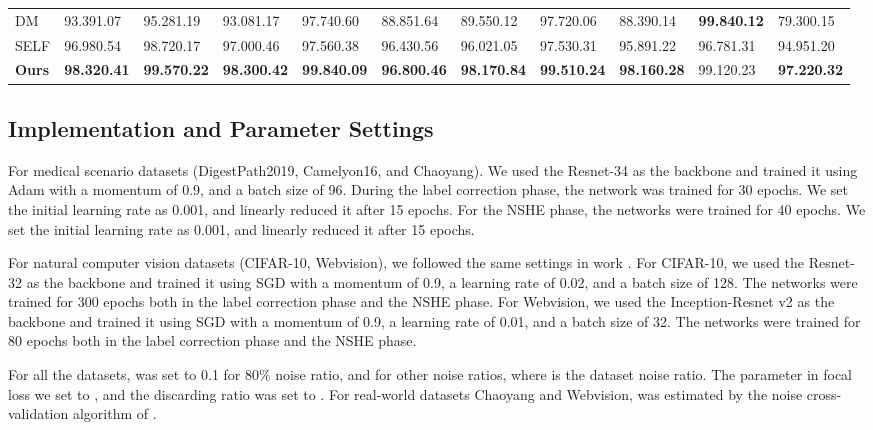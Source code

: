 \begin{table*}[]
\begin{tabular}{@{}lllllllllll@{}}
DM                       & 93.391.07          & 95.281.19          & 93.081.17               & 97.740.60          & 88.851.64             & 89.550.12          & 97.720.06          & 88.390.14               & \textbf{99.840.12} & 79.300.15             \\
SELF                            & 96.980.54          & 98.720.17          & 97.000.46               & 97.560.38          & 96.430.56             & 96.021.05          & 97.530.31          & 95.891.22               & 96.781.31          & 94.951.20             \\
\textbf{Ours}                   & \textbf{98.320.41} & \textbf{99.570.22} & \textbf{98.300.42}      & \textbf{99.840.09} & \textbf{96.800.46}    & \textbf{98.170.84} & \textbf{99.510.24} & \textbf{98.160.28}      & 99.120.23          & \textbf{97.220.32}    \\ \bottomrule
\end{tabular}
\end{table*}

\subsection{Implementation and Parameter Settings}
\label{sec:impl}

For medical scenario datasets (DigestPath2019, Camelyon16, and Chaoyang). We used the Resnet-34 as the backbone and trained it using Adam with a momentum of 0.9, and a batch size of 96. During the label correction phase, the network was trained for 30 epochs. We set the initial learning rate as 0.001, and linearly reduced it after 15 epochs. For the NSHE phase, the networks were trained for 40 epochs. We set the initial learning rate as 0.001, and linearly reduced it after 15 epochs.

{For natural computer vision datasets (CIFAR-10, Webvision), we followed the same settings in work \cite{chen2019understanding}. For CIFAR-10, we used the Resnet-32 as the backbone and trained it using SGD with a momentum of 0.9, a learning rate of 0.02, and a batch size of 128. The networks were trained for 300 epochs both in the label correction phase and the NSHE phase. For Webvision, we used the Inception-Resnet v2 \cite{2017Inception} as the backbone and trained it using SGD with a momentum of 0.9, a learning rate of 0.01, and a batch size of 32. The networks were trained for 80 epochs both in the label correction phase and the NSHE phase.}

{For all the datasets,  was set to 0.1 for 80\% noise ratio, and  for other noise ratios, where  is the dataset noise ratio. The parameter  in focal loss we set to , and the discarding ratio  was set to . For real-world datasets Chaoyang and Webvision,  was estimated by the noise cross-validation algorithm of \cite{chen2019understanding}.}

